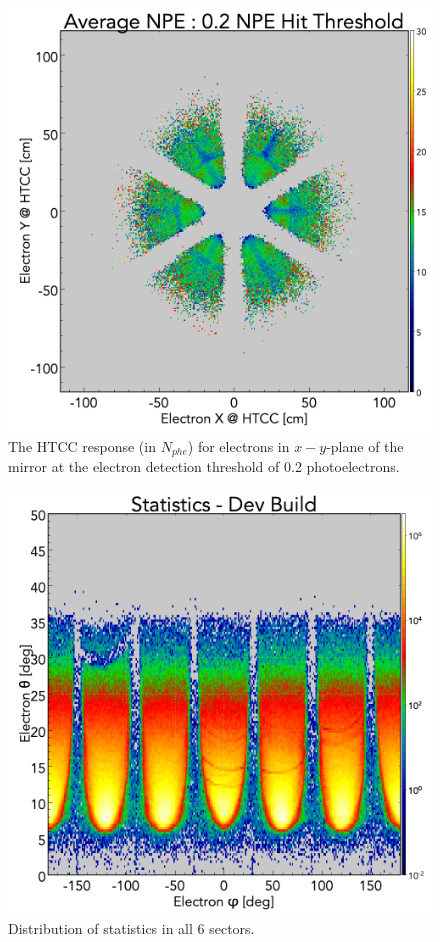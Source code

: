 \begin{figure}[!ht]
    \centering
    \includegraphics[width=1.0\linewidth,trim={0.0cm 0.0cm 0.0cm 1.67cm},clip]{images/avgNPE_XY_Dev_Build_02npe.png}
    \caption{The HTCC response (in $N_{phe}$) for electrons in $x-y$-plane of the mirror at the electron detection threshold of 0.2 photoelectrons.}
    \label{fig:avgNPE_XY_Dev_Build_02npe}
\end{figure}

\begin{figure}[!ht]
    \centering
    \includegraphics[width=1.0\linewidth,trim={0.0cm 0.0cm 0.0cm 1.67cm},clip]{images/statistics_Theta_Phi_Dev_Build_NO_HOLES.png}
    \caption{Distribution of statistics in all 6 sectors.}
    \label{fig:statistics_Theta_Phi_Dev_Build_NO_HOLES}
\end{figure}

